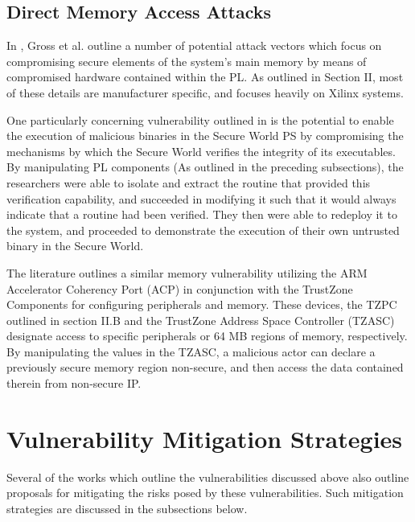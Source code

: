 \documentclass[journal]{IEEEtran}
\begin{document}
\subsection{Direct Memory Access Attacks}
In \cite{gross_breaking_2019}, Gross et al. outline a number of potential attack vectors
which focus on compromising secure elements of the system's main memory by means of 
compromised hardware contained within the PL. As outlined in Section II, most of these
details are manufacturer specific, and \cite{gross_breaking_2019} focuses heavily on
Xilinx systems.

One particularly concerning vulnerability outlined in \cite{gross_breaking_2019} is the
potential to enable the execution of malicious binaries in the Secure World PS by 
compromising the mechanisms by which the Secure World verifies the integrity of its
executables. By manipulating PL components (As outlined in the preceding subsections),
the researchers were able to isolate and extract the routine that provided this
verification capability, and succeeded in modifying it such that it would always indicate
that a routine had been verified. They then were able to redeploy it to the system, and
proceeded to demonstrate the execution of their own untrusted binary in the Secure World.

The literature \cite{benhani_security_2019} outlines a similar memory vulnerability
utilizing the ARM Accelerator Coherency Port (ACP) in conjunction with the TrustZone
Components for configuring peripherals and memory. These devices, the TZPC outlined in 
section II.B and the TrustZone Address Space Controller (TZASC) designate access to
specific peripherals or 64 MB regions of memory, respectively. By manipulating the values
in the TZASC, a malicious actor can declare a previously secure memory region non-secure,
and then access the data contained therein from non-secure IP.

\section{Vulnerability Mitigation Strategies}
Several of the works which outline the vulnerabilities discussed above also outline
proposals for mitigating the risks posed by these vulnerabilities. Such mitigation
strategies are discussed in the subsections below.
\end{document}
